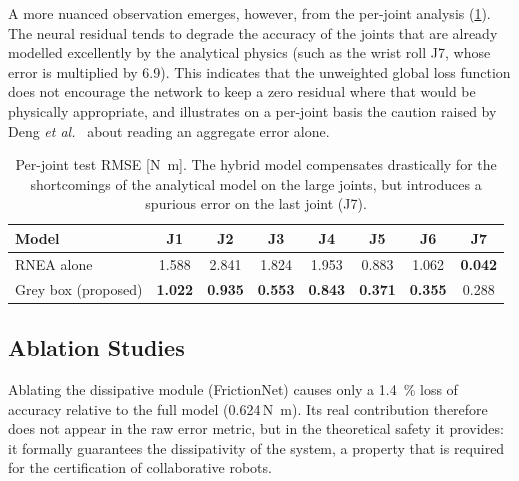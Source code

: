 \documentclass[a4paper, oneside]{article}
\begin{document}
A more nuanced observation emerges, however, from the per-joint analysis (\cref{tab-perjoint-baselines}). The neural residual tends to degrade the accuracy of the joints that are already modelled excellently by the analytical physics (such as the wrist roll J7, whose error is multiplied by \num{6.9}). This indicates that the unweighted global loss function does not encourage the network to keep a zero residual where that would be physically appropriate, and illustrates on a per-joint basis the caution raised by Deng \emph{et al.}~\cite{deng2024} about reading an aggregate error alone.

\begin{table}[htbp]
\centering
\caption{Per-joint test RMSE [\si{\newton\meter}]. The hybrid model compensates drastically for the shortcomings of the analytical model on the large joints, but introduces a spurious error on the last joint (J7).}
\label{tab-perjoint-baselines}
\small
\begin{tabular}{@{}lccccccc@{}}
\toprule
Model & J1 & J2 & J3 & J4 & J5 & J6 & J7 \\
\midrule
RNEA alone & \num{1.588} & \num{2.841} & \num{1.824} & \num{1.953} & \num{0.883} & \num{1.062} & \textbf{\num{0.042}} \\
Grey box (proposed) & \textbf{\num{1.022}} & \textbf{\num{0.935}} & \textbf{\num{0.553}} & \textbf{\num{0.843}} & \textbf{\num{0.371}} & \textbf{\num{0.355}} & \num{0.288} \\
\bottomrule
\end{tabular}
\end{table}

\subsection{Ablation Studies}
\label{sec-res-ablations}

Ablating the dissipative module (FrictionNet) causes only a \SI{1.4}{\percent} loss of accuracy relative to the full model (\num{0.624}\,\si{\newton\meter}). Its real contribution therefore does not appear in the raw error metric, but in the theoretical safety it provides: it formally guarantees the dissipativity of the system, a property that is required for the certification of collaborative robots.
\end{document}
